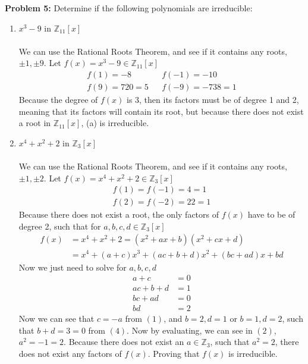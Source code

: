 \documentclass[12pt]{article}
\begin{document}
\newpage 

\noindent \textbf{Problem 5: }Determine if the following polynomials are irreducible:
	\begin{enumerate}[label = (\alph*)]
		\item $x^3 - 9$ in $\mathbb{Z}_{11}[x]$
		\\ \\
		We can use the Rational Roots Theorem, and see if it contains any roots, $\pm 1, \pm 9$. Let $f(x) = x^3 - 9 \in \mathbb{Z}_{11}[x]$
			\begin{align*}	
				f(1) = -8 && f(-1) = -10 \\
				f(9) = 720 = 5 && f(-9) = -738 = 1 	
			\end{align*}
		Because the degree of $f(x)$ is 3, then its factors must be of degree 1 and 2, meaning that its factors will contain its root, but because there does not exist a root in $\mathbb{Z}_{11}[x]$, (a) is irreducible.
		\\
		\item $x^4 + x^2 + 2$ in $\mathbb{Z}_{3}[x]$
		\\ \\
		We can use the Rational Roots Theorem, and see if it contains any roots, $\pm 1, \pm 2$. Let $f(x) = x^4 + x^2 + 2 \in \mathbb{Z}_{3}[x]$
			\begin{align*}
				f(1) = f(-1) = 4 = 1 \\
				f(2) = f(-2) = 22 = 1
			\end{align*}
		Because there does not exist a root, the only factors of $f(x)$ have to be of degree 2, such that for $a,b,c,d \in \mathbb{Z}_{3}[x]$ 
		\begin{align*}
			f(x) &= x^4 + x^2 + 2 = (x^2 + ax + b)(x^2 + cx + d) \\
			&= x^4 + (a+c)x^3 + (ac + b + d)x^2 + (bc + ad)x + bd
		\end{align*}
		Now we just need to solve for $a,b,c,d$
		\begin{align}
			a + c &= 0 \\
			ac + b + d &= 1 \\
			bc + ad &= 0 \\
			bd &= 2	
		\end{align}
		Now we can see that $c = -a$ from $(1)$, and $b = 2, d = 1$ or $b = 1, d = 2$, such that $b+d = 3 = 0$ from $(4)$. Now by evaluating, we can see in $(2)$, $a^2 = -1 = 2$.  Because there does not exist an $a \in \mathbb{Z}_{3}$, such that $a^2 = 2$, there does not exist any factors of $f(x)$. Proving that $f(x)$ is irreducible.
	\end{enumerate}
\end{document}

